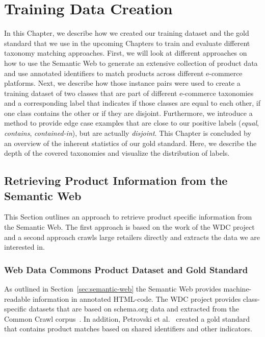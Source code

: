 \chapter{Training Data Creation}
\label{ch:dataset-creation}

In this Chapter, we describe how we created our training dataset and the gold standard that we use in the upcoming Chapters
to train and evaluate different taxonomy matching approaches.
First, we will look at different approaches on how to use the Semantic Web to generate an extensive collection
of product data and use annotated identifiers to match products across different e-commerce platforms.
Next, we describe how those instance pairs were used to create a training dataset of two classes that are part
of different e-commerce taxonomies and a corresponding label that indicates if those classes are equal to each other,
if one class contains the other or if they are disjoint.
Furthermore, we introduce a method to provide edge case examples that are close to our positive labels (\emph{equal}, \emph{contains},
\emph{contained-in}), but are actually \emph{disjoint}.
This Chapter is concluded by an overview of the inherent statistics of our gold standard.
Here, we describe the depth of the covered taxonomies and visualize the distribution of labels.

\section{Retrieving Product Information from the Semantic Web}
\label{sec:retrieve-product-semantic-web}

This Section outlines an approach to retrieve product specific information from the Semantic Web.
The first approach is based on the work of the WDC project and a second approach crawls large
retailers directly and extracts the data we are interested in.

\subsection{Web Data Commons Product Dataset and Gold Standard}

As outlined in Section~\ref{sec:semantic-web} the Semantic Web provides machine-readable information in annotated
HTML-code.
The WDC project provides class-specific datasets that are based on schema.org data and extracted from the
Common Crawl corpus~\cite{meusel2014webdatacommons}.
In addition, Petrovski et al.\@~\cite{petrovski2016wdc} created a gold standard that contains product matches
based on shared identifiers and other indicators.

